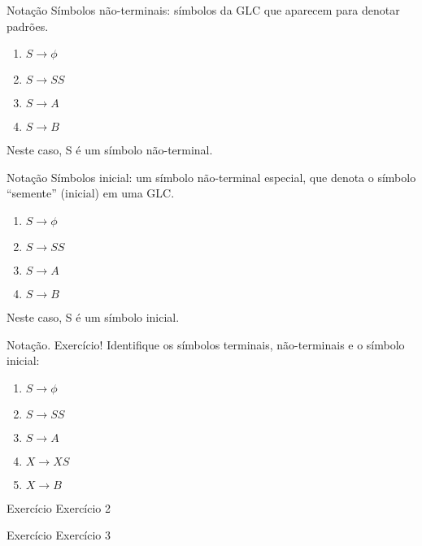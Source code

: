 \documentclass{beamer}
\begin{document}
\begin{frame}{Notação}
\Large
  Símbolos não-terminais: símbolos da GLC que aparecem para denotar padrões.
  \begin{enumerate}
  \item $S \rightarrow \phi$
  \item $S \rightarrow S S$
  \item $S \rightarrow A$
  \item $S \rightarrow B$
  \end{enumerate}
  Neste caso, S é um símbolo não-terminal.
\end{frame}

\begin{frame}{Notação}
\Large
  Símbolos inicial: um símbolo não-terminal especial, que denota o símbolo
  ``semente'' (inicial) em uma GLC.
  \begin{enumerate}
  \item $S \rightarrow \phi$
  \item $S \rightarrow S S$
  \item $S \rightarrow A$
  \item $S \rightarrow B$
  \end{enumerate}
  Neste caso, S é um símbolo inicial.
\end{frame}

\begin{frame}{Notação. Exercício!}
\Large
  Identifique os símbolos terminais, não-terminais e o símbolo inicial:
  \begin{enumerate}
  \item $S \rightarrow \phi$
  \item $S \rightarrow S S$
  \item $S \rightarrow A$
  \item $X \rightarrow X S$
  \item $X \rightarrow B$
  \end{enumerate}
\end{frame}

\begin{frame}{Exercício}
\Large
\centering
  Exercício 2
\end{frame}

\begin{frame}{Exercício}
\Large
\centering
  Exercício 3

\end{frame}
\end{document}
